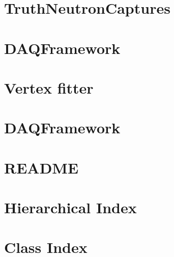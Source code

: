 \let\mypdfximage\pdfximage\def\pdfximage{\immediate\mypdfximage}\documentclass[twoside]{book}
\newcommand{\+}{\discretionary{\mbox{\scriptsize$\hookleftarrow$}}{}{}}
\begin{document}
\chapter{Truth\+Neutron\+Captures}
\label{md_UserTools_TruthNeutronCaptures_v3_README}

\chapter{DAQFramework}
\label{md_UserTools_vectgen_README}

\chapter{Vertex fitter}
\label{md_UserTools_VertexFitter_README}

\chapter{DAQFramework}
\label{md_UserTools_WriteSkEvent_README}

\chapter{README}
\label{md_DataModel_README}

\chapter{Hierarchical Index}

\chapter{Class Index}

\end{document}
